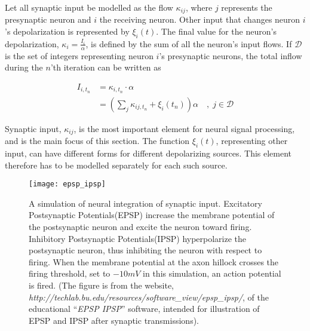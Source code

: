 	Let all synaptic input be modelled as the flow $\kappa_{ij}$, where $j$ represents the presynaptic neuron and $i$ the receiving neuron.
	Other input that changes neuron $i$'s depolarization is represented by $\xi_i(t)$.
	The final value for the neuron's depolarization, $\kappa_i = \frac{I_i}{\alpha}$, is defined by the sum of all the neuron's input flows.
	If $\mathscr{D}$ is the set of integers representing neuron $i$'s presynaptic neurons, the total inflow during the $n$'th iteration can be written as

		\begin{equation}
			\begin{split}
			I_{i, t_n} 	&= \kappa_{i,t_n} \cdot \alpha \\
						&= \left( \sum_{j} \kappa_{ij, t_n} + \xi_i(t_n) \right) \alpha \quad,\; j\in\mathscr{D}
			\end{split}
			\label{eqSynapticIntegrationForKANN}
		\end{equation}

	Synaptic input, $\kappa_{ij}$, is the most important element for neural signal processing\cite{PrinciplesOfNeuralScience4edKAP10}, and is the main focus of this section.
	The function $\xi_i(t)$, representing other input, can have different forms for different depolarizing sources.
	This element therefore has to be modelled separately for each such source.

\begin{figure}[hbt!p]
	\centering
	\texttt{[image: epsp\_ipsp]}
	\caption[Illustration of neural integration of synaptic input]{
			A simulation of neural integration of synaptic input. 
			Excitatory Postsynaptic Potentials(EPSP) increase the membrane potential of the postsynaptic neuron and excite the neuron toward firing.
			Inhibitory Postsynaptic Potentials(IPSP) hyperpolarize the postsynaptic neuron, thus inhibiting the neuron with respect to firing. %
			When the membrane potential at the axon hillock crosses the firing threshold, set to $-10mV$ in this simulation, an action potential is fired.
			(The figure is from the website, {\tiny{\emph{http://techlab.bu.edu/resources/software\_view/epsp\_ipsp/}}}, of the educational  ``\emph{EPSP IPSP}'' software, intended for illustration of EPSP and IPSP after synaptic transmissions).
				}
	\label{figIllustrationOfEPSPandIPSP}
\end{figure}


